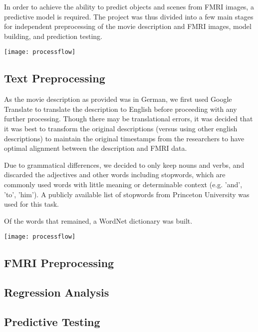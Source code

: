 

\par In order to achieve the ability to predict objects and scenes 
from FMRI images, a predictive model is required. The project was thus 
divided into a few main stages for independent preprocessing of the 
movie description and FMRI images, model building, and prediction
testing.

\centerline{\texttt{[image: processflow]}}

\subsection{Text Preprocessing}
\par As the movie description as provided was in German, we first used Google
Translate to translate the description to English before proceeding with 
any further processing. Though there may be translational errors, it was decided
that it was best to transform the original descriptions (versus using other english descriptions) to maintain the original timestamps from the researchers
to have optimal alignment between the description and FMRI data.

\par Due to grammatical differences, we decided to
 only keep nouns and verbs, and discarded the adjectives and other words including
 stopwords, which are commonly used words with little meaning or determinable context (e.g. 'and', 'to', 'him'). A publicly available list of stopwords from Princeton University was used for this task. 

 \par Of the words that remained, a WordNet dictionary was built.

 \centerline{\texttt{[image: processflow]}}

\subsection{FMRI Preprocessing}

\subsection{Regression Analysis}

\subsection{Predictive Testing}

